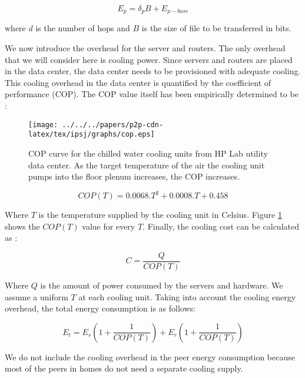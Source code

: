 \begin{equation}\label{eqn:E_p}
E_p = \delta_p B + E_{p-base}
\end{equation} 

where $d$ is the number of hops and $B$ is the size of file to be transferred in bits.

We now introduce the overhead for the server and routers. 
The only overhead that we will consider here is cooling power.  
Since servers and routers are placed in the data center, the data center needs to be provisioned with adequate cooling. 
This cooling overhead in the data center is quantified by the coefficient of performance (COP). 
The COP value itself has been empirically determined to be  \cite{moore2005making}:

\begin{figure}[tb]
\begin{center}
\texttt{[image: ../../../papers/p2p-cdn-latex/tex/ipsj/graphs/cop.eps]}
\end{center}
\caption{COP curve for the chilled water cooling units from HP Lab utility data center.
As the target temperature of the air the cooling unit pumps into the floor plenum increases, the COP increases.}
\label{fig:copgraph}
\end{figure} 

\begin{equation}\label{eqn:copt}
	COP(T) = 0.0068.T^2 + 0.0008.T + 0.458
\end{equation}

Where $T$ is the temperature supplied by the cooling unit in Celsius.
Figure \ref{fig:copgraph} shows the $COP(T)$ value for every $T$.
Finally, the cooling cost can be calculated as \cite{moore2005making}:

\begin{equation}\label{eqn:cost}
C = \frac{Q}{COP(T)}
\end{equation}

Where $Q$ is the amount of power consumed by the servers and hardware. 
We assume a uniform $T$ at each cooling unit. 
Taking into account the cooling energy overhead, the total energy consumption is as follows:

\begin{equation}
	E_{t} = E_s \left(1 + \frac{1}{COP(T)}\right) + E_r \left(1 + \frac{1}{COP(T)}\right)
\end{equation}

We do not include the cooling overhead in the peer energy consumption because most of the peers in homes do not need a separate cooling supply.


